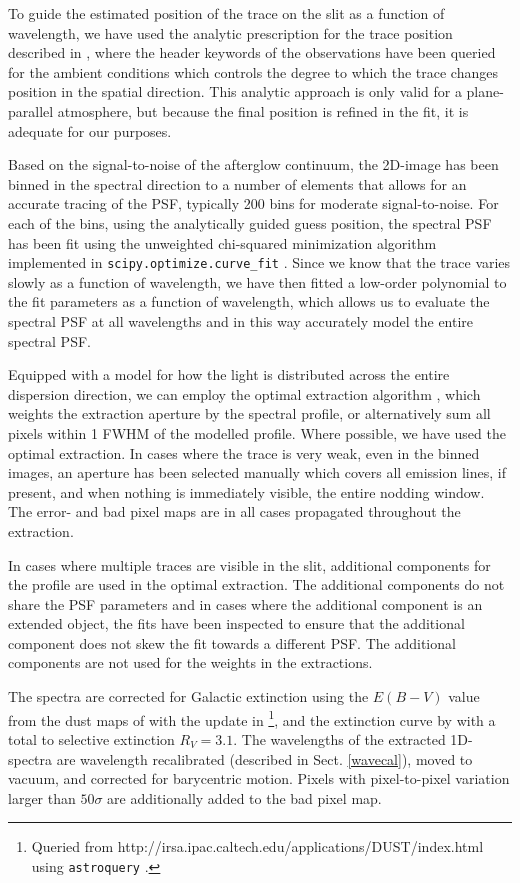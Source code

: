 \documentclass[longauth]{aa}    %
\begin{document}
To guide the estimated position of the trace on the slit as a function of
wavelength, we have used the analytic prescription for the trace position
described in \citet{Filippenko1982}, where the header keywords of the
observations have been queried for the ambient conditions which controls the
degree to which the trace changes position in the spatial direction. This
analytic approach is only valid for a plane-parallel atmosphere, but because the
final position is refined in the fit, it is adequate for our purposes.

Based on the signal-to-noise of the afterglow continuum, the 2D-image has been
binned in the spectral direction to a number of elements that allows for an
accurate tracing of the PSF, typically 200 bins for moderate signal-to-noise.
For each of the bins, using the analytically guided guess position, the spectral
PSF has been fit using the unweighted chi-squared minimization algorithm
implemented in \texttt{scipy.optimize.curve\_fit} \citep{scipy}. Since we know
that the trace varies slowly as a function of wavelength, we have then fitted a
low-order polynomial to the fit parameters as a function of wavelength, which
allows us to evaluate the spectral PSF at all wavelengths and in this way
accurately model the entire spectral PSF.

Equipped with a model for how the light is distributed across the entire
dispersion direction, we can  employ the optimal extraction algorithm
\citep{Horne1986}, which weights the extraction aperture by the spectral profile,
or alternatively sum all pixels within 1 FWHM of the modelled profile. Where
possible, we have used the optimal extraction. In cases where the trace is very
weak, even in the binned images, an aperture has been selected manually which
covers all emission lines, if present, and when nothing is immediately visible, the
entire nodding window. The error- and bad pixel maps are in all cases propagated
throughout the extraction.

In cases where multiple traces are visible in the slit, additional components
for the profile are used in the optimal extraction. The additional components do
not share the PSF parameters and in cases where the additional component is an
extended object, the fits have been inspected to ensure that the additional
component does not skew the fit towards a different PSF. The additional
components are not used for the weights in the extractions.

The spectra are corrected for Galactic extinction using the $E(B-V)$ value from
the dust maps of \citet{Schlegel1998} with the update in
\citet{Schlafly2011}\footnote{Queried from
	http://irsa.ipac.caltech.edu/applications/DUST/index.html using
	\texttt{astroquery} \citep{astroquery}.}, and the extinction curve by
\cite{Cardelli1989} with a total to selective extinction $R_V = 3.1$. The
wavelengths of the extracted 1D-spectra are wavelength recalibrated (described
in Sect. \ref{wavecal}), moved to vacuum, and corrected for barycentric motion.
Pixels with pixel-to-pixel variation larger than $50 \sigma$ are additionally
added to the bad pixel map.
\end{document}
